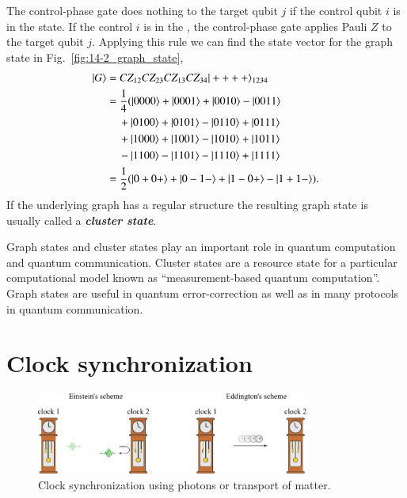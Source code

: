 The control-phase gate does nothing to the target qubit $j$ if the control qubit $i$ is in the  state.
If the control $i$ is in the , the control-phase gate applies Pauli $Z$ to the target qubit $j$.
Applying this rule we can find the state vector for the graph state  in Fig.~\ref{fig:14-2_graph_state},
\begin{align}
    \left| G \right\rangle & = CZ_{12} CZ_{23} CZ_{13} CZ_{34} |++++\rangle_{1234} \nonumber\\
    & = \frac{1}{4} ( |0000\rangle + |0001\rangle + |0010\rangle - |0011\rangle \nonumber\\
    & \; \; \; \; + |0100\rangle + |0101\rangle - |0110\rangle + |0111\rangle \\
    & \; \; \; \; + |1000\rangle + |1001\rangle - |1010\rangle + |1011\rangle \\
    & \; \; \; \; - |1100\rangle - |1101\rangle - |1110\rangle + |1111\rangle \\
    & = \frac{1}{2} ( |0+0+\rangle + |0-1-\rangle + |1-0+\rangle - |1+1-\rangle ).
\end{align}
If the underlying graph has a regular structure the resulting graph state is usually called a \textbf{\textit{cluster state}}.

Graph states and cluster states play an important role in quantum computation and quantum communication.
Cluster states are a resource state for a particular computational model known as ``measurement-based quantum computation''.
Graph states are useful in quantum error-correction as well as in many protocols in quantum communication.





\section{Clock synchronization}
\label{sec:14-3_clock_sync}

\begin{figure}[t]
    \centering
    \includegraphics[width=0.8\textwidth]{lesson14/14-3_clock_sync.pdf}
    \caption[Clock synchronization.]{Clock synchronization using photons or transport of matter.}
    \label{fig:14-3_clock_sync}
\end{figure}


